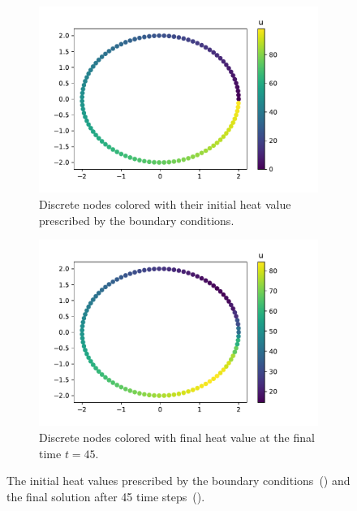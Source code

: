 \begin{figure}[bt]
\begin{subfigure}{.45\textwidth}
\centering
\includegraphics[width=\linewidth]{./images/initial_conditons.pdf}
\caption{Discrete nodes colored with their initial heat value prescribed by the boundary conditions.}
\label{fig::heat::initial}
\end{subfigure}
\hfill
\begin{subfigure}{.45\textwidth}
  \centering
  \includegraphics[width=\linewidth]{./images/solution.pdf}
\caption{Discrete nodes colored with final heat value at the final time $t=45$. }
\label{fig::heat:solution}
\end{subfigure}
\caption{The initial heat values prescribed by the boundary conditions~() and the final solution after 45 time steps~().}
\end{figure}


